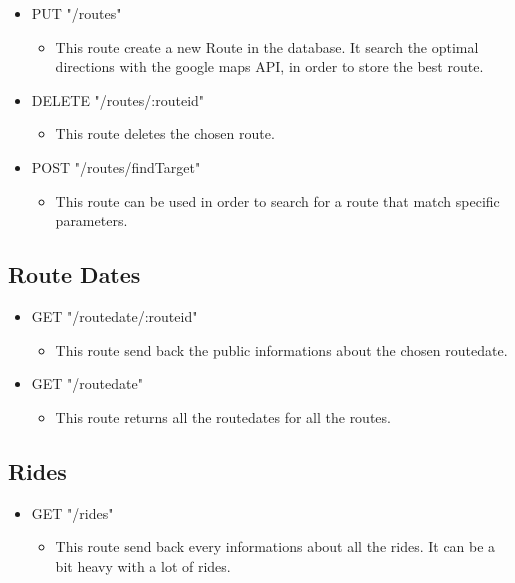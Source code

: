\begin{itemize}
	\item PUT "/routes"
	\begin{itemize}
		\item This route create a new Route in the database. It search the optimal directions with the google maps API, in order to store the best route.
	\end{itemize}
\end{itemize}

\begin{itemize}
	\item DELETE "/routes/:routeid"
	\begin{itemize}
		\item This route deletes the chosen route.
	\end{itemize}
\end{itemize}

\begin{itemize}
	\item POST "/routes/findTarget"
	\begin{itemize}
		\item 	This route can be used in order to search for a route that match specific parameters.
	\end{itemize}
\end{itemize}

\subsection{Route Dates}
\begin{itemize}
	\item GET "/routedate/:routeid"
	\begin{itemize}
		\item This route send back the public informations about the chosen routedate.
	\end{itemize}
\end{itemize}

\begin{itemize}
	\item GET "/routedate"
	\begin{itemize}
		\item This route returns all the routedates for all the routes.
	\end{itemize}
\end{itemize}

\subsection{Rides}
\begin{itemize}
	\item GET "/rides"
	\begin{itemize}
		\item This route send back every informations about all the rides. It can be a bit heavy with a lot of rides.
	\end{itemize}
\end{itemize}

